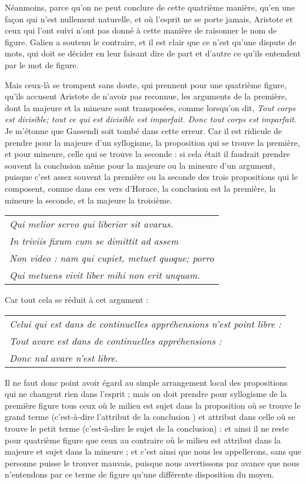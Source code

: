 Néanmoins, parce qu'on ne peut conclure de cette quatrième manière, qu'en une façon qui n'est nullement naturelle, et où l'esprit ne se porte jamais, Aristote et ceux qui l'ont suivi n'ont pas donné à cette manière de raisonner le nom de figure. Galien a soutenu le contraire, et il est clair que ce n'est qu'une dispute de mots, qui doit se décider en leur faisant dire de part et d'autre ce qu'ils entendent par le mot de figure.

Mais ceux-là se trompent sans doute, qui prennent pour une quatrième figure, qu'ils accusent Aristote de n'avoir pas reconnue, les arguments de la première, dont la majeure et la mineure sont transposées, comme lorsqu'on dit, \emph{Tout corps est divisible; tout ce qui est divisible est imparfait. Donc tout corps est imparfait}. Je m'étonne que Gassendi soit tombé dans cette erreur. Car il est ridicule de prendre pour la majeure d'un syllogisme, la proposition qui se trouve la première, et pour mineure, celle qui se trouve la seconde : si cela était il faudrait prendre souvent la conclusion même pour la majeure ou la mineure d'un argument, puisque c'est assez souvent la première ou la seconde des trois propositions qui le composent, comme dans ces vers d'Horace, la conclusion est la première, la mineure la seconde, et la majeure la troisième.

	\begin{tabularx}{\textwidth}{X}
		\emph{Qui melior servo qui liberior sit avarus.} \\
		\emph{In triviis fixum cum se dimittit ad assem} \\
		\emph{Non video : nam qui cupiet, metuet quoque; porro} \\
		\emph{Qui metuens vivit liber mihi non erit unquam.} \\
	\end{tabularx}


Car tout cela se réduit à cet argument :

	\begin{tabularx}{\textwidth}{X}
		\emph{Celui qui est dans de continuelles appréhensions n'est point libre :} \\
		\emph{Tout avare est dans de continuelles appréhensions :} \\
		\emph{Donc nul avare n'est libre.} \\
	\end{tabularx}

Il ne faut donc point avoir égard au simple arrangement local des propositions qui ne changent rien dans l'esprit ; mais on doit prendre pour syllogisme de la première figure tous ceux où le milieu est sujet dans la proposition où se trouve le grand terme (c'est-à-dire l'attribut de la conclusion ) et attribut dans celle où se trouve le petit terme (c'est-à-dire le sujet de la conclusion) : et ainsi il ne reste pour quatrième figure que ceux au contraire où le milieu est attribut dans la majeure et sujet dans la mineure ; et c'est ainsi que nous les appellerons, sans que personne puisse le trouver mauvais, puisque nous avertissons par avance que nous n'entendons par ce terme de figure qu'une différente disposition du moyen.

